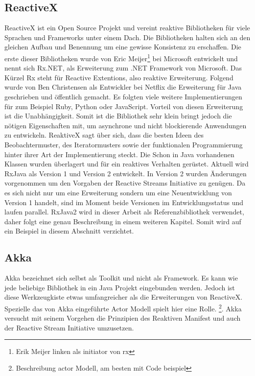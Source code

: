 \subsection{ReactiveX}
ReactiveX ist ein Open Source Projekt und vereint reaktive Bibliotheken für viele Sprachen und Frameworks unter einem Dach. Die Bibliotheken halten sich an den gleichen Aufbau und Benennung um eine gewisse Konsistenz zu erschaffen. Die erste dieser Bibliotheken wurde von Eric Meijer\footnote{Erik Meijer linken als initiator von rx} bei Microsoft entwickelt und nennt sich Rx.NET, als Erweiterung zum .NET Framework von Microsoft. Das Kürzel Rx steht für Reactive Extentions, also reaktive Erweiterung. Folgend wurde von Ben Christensen als Entwickler bei Netflix die Erweiterung für Java geschrieben und öffentlich gemacht. Es folgten viele weitere Implementierungen für zum Beispiel Ruby, Python oder JavaScript. Vorteil von diesen Erweiterung ist die Unabhängigkeit. Somit ist die Bibliothek sehr klein bringt jedoch die nötigen Eigenschaften mit, um asynchrone und nicht blockierende Anwendungen zu entwickeln. ReaktiveX sagt über sich, dass die besten Ideen des Beobachtermuster, des Iteratormusters sowie der funktionalen Programmierung hinter ihrer Art der Implementierung steckt. Die Schon in Java vorhandenen Klassen wurden überlagert und für ein reaktives Verhalten gerüstet. Aktuell wird RxJava als Version 1 und Version 2 entwickelt. In Version 2 wurden Änderungen vorgenommen um den Vorgaben der Reactive Streams Initiative zu genügen. Da es sich nicht nur um eine Erweiterung sondern um eine Neuentwicklung von Version 1 handelt, sind im Moment beide Versionen im Entwicklungsstatus und laufen parallel. RxJava2 wird in dieser Arbeit als Referenzbibliothek verwendet, daher folgt eine genau Beschreibung in einem weiteren Kapitel. Somit wird auf ein Beispiel in diesem Abschnitt verzichtet.
\subsection{Akka}
Akka bezeichnet sich selbst als Toolkit und nicht als Framework. Es kann wie jede beliebige Bibliothek in ein Java Projekt eingebunden werden. Jedoch ist diese Werkzeugkiste etwas umfangreicher als die Erweiterungen von ReactiveX. Spezielle das von Akka eingeführte Actor Modell spielt hier eine Rolle. \footnote{Beschreibung actor Modell, am besten mit Code beispiel}. Akka versucht mit seinem Vorgehen die Prinzipien des Reaktiven Manifest und auch der Reactive Stream Initiative umzusetzen.
